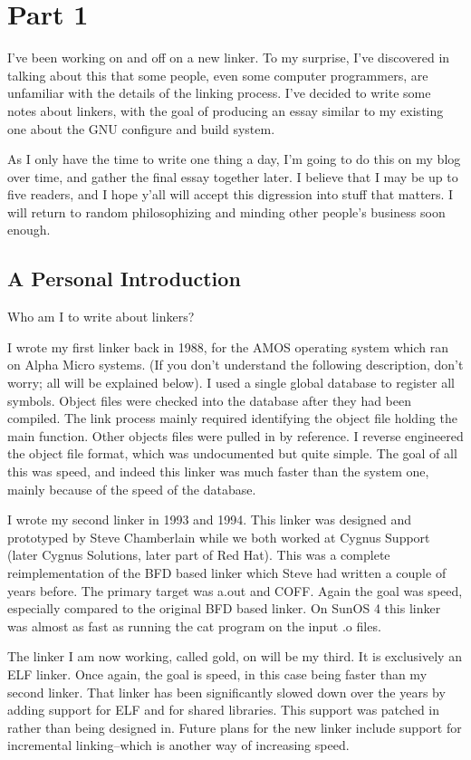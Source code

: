 \section{Part 1}

I've been working on and off on a new linker. To my surprise, I've
discovered in talking about this that some people, even some computer
programmers, are unfamiliar with the details of the linking process.
I've decided to write some notes about linkers, with the goal of
producing an essay similar to my existing one about the GNU configure
and build system.

As I only have the time to write one thing a day, I'm going to do
this on my blog over time, and gather the final essay together later.
I believe that I may be up to five readers, and I hope y'all will
accept this digression into stuff that matters. I will return to random
philosophizing and minding other people's business soon enough.

\subsection{A Personal Introduction}

Who am I to write about linkers?

I wrote my first linker back in 1988, for the AMOS operating system
which ran on Alpha Micro systems. (If you don't understand the
following description, don't worry; all will be explained below). I
used a single global database to register all symbols. Object files were
checked into the database after they had been compiled. The link process
mainly required identifying the object file holding the main function.
Other objects files were pulled in by reference. I reverse engineered
the object file format, which was undocumented but quite simple. The
goal of all this was speed, and indeed this linker was much faster than
the system one, mainly because of the speed of the database.

I wrote my second linker in 1993 and 1994. This linker was designed and
prototyped by Steve Chamberlain while we both worked at Cygnus Support
(later Cygnus Solutions, later part of Red Hat). This was a complete
reimplementation of the BFD based linker which Steve had written a
couple of years before. The primary target was a.out and COFF\@. Again
the goal was speed, especially compared to the original BFD based
linker. On SunOS 4 this linker was almost as fast as running the cat
program on the input .o files.

The linker I am now working, called gold, on will be my third. It is
exclusively an ELF linker. Once again, the goal is speed, in this case
being faster than my second linker. That linker has been significantly
slowed down over the years by adding support for ELF and for shared
libraries. This support was patched in rather than being designed
in. Future plans for the new linker include support for incremental
linking--which is another way of increasing speed.

